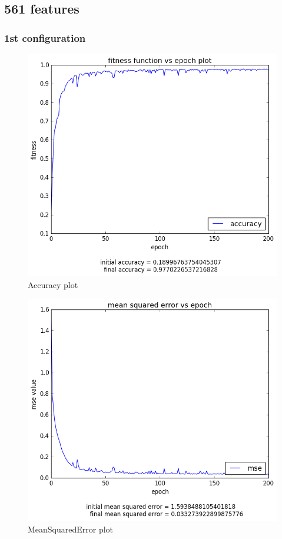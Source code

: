 \documentclass[12pt,a4paper]{article}
\begin{document}
\subsection{561 features}
\subsubsection{1st configuration}
\begin{figure}[H]
\centering
\includegraphics[scale=0.4]{img/all_acc.png}
\caption{Accuracy plot}
\end{figure}
\begin{figure}[H]
\centering
\includegraphics[scale=0.4]{img/all_mse.png}
\caption{MeanSquaredError plot}
\end{figure}
\end{document}
